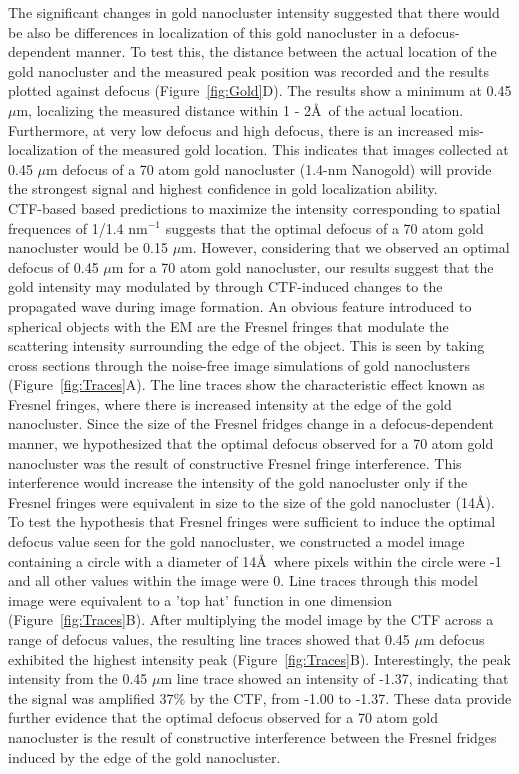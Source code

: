  \indent The significant changes in gold nanocluster intensity suggested that there would be also be differences in localization of this gold nanocluster in a defocus-dependent manner. To test this, the distance between the actual location of the gold nanocluster and the measured peak position was recorded and the results plotted against defocus (Figure~\ref{fig:Gold}D). The results show a minimum at 0.45 $\mu$m, localizing the measured distance within 1 - 2\AA\ of the actual location. Furthermore, at very low defocus and high defocus, there is an increased mis-localization of the measured gold location. This indicates that images collected at 0.45 $\mu$m defocus of a 70 atom gold nanocluster (1.4-nm Nanogold) will provide the strongest signal and highest confidence in gold localization ability.\\
 \indent CTF-based based predictions to maximize the intensity corresponding to spatial frequences of 1/1.4 nm$^{-1}$ suggests that the optimal defocus of a 70 atom gold nanocluster would be 0.15 $\mu$m. However, considering that we observed an optimal defocus of 0.45 $\mu$m for a 70 atom gold nanocluster, our results suggest that the gold intensity may modulated by through CTF-induced changes to the propagated wave during image formation. An obvious feature introduced to spherical objects with the EM are the Fresnel fringes that modulate the scattering intensity surrounding the edge of the object. This is seen by taking cross sections through the noise-free image simulations of gold nanoclusters (Figure~\ref{fig:Traces}A). The line traces show the characteristic effect known as Fresnel fringes, where there is increased intensity at the edge of the gold nanocluster. Since the size of the Fresnel fridges change in a defocus-dependent manner, we hypothesized that the optimal defocus observed for a 70 atom gold nanocluster was the result of constructive Fresnel fringe interference. This interference would increase the intensity of the gold nanocluster only if the Fresnel fringes were equivalent in size to the size of the gold nanocluster (14\AA). \\
 \indent To test the hypothesis that Fresnel fringes were sufficient to induce the optimal defocus value seen for the gold nanocluster, we constructed a model image containing a circle with a diameter of 14\AA\, where pixels within the circle were -1 and all other values within the image were 0. Line traces through this model image were equivalent to a 'top hat' function in one dimension (Figure~\ref{fig:Traces}B). After multiplying the model image by the CTF across a range of defocus values, the resulting line traces showed that 0.45 $\mu$m defocus exhibited the highest intensity peak (Figure~\ref{fig:Traces}B). Interestingly, the peak intensity from the 0.45 $\mu$m line trace showed an intensity of -1.37, indicating that the signal was amplified 37\% by the CTF, from -1.00 to -1.37. These data provide further evidence that the optimal defocus observed for a 70 atom gold nanocluster is the result of constructive interference between the Fresnel fridges induced by the edge of the gold nanocluster.\\

